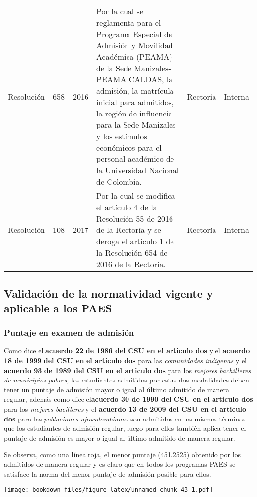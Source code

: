 \documentclass[]{article}
\theoremstyle{definition}
\theoremstyle{definition}
\theoremstyle{definition}
\theoremstyle{remark}
\begin{document}
\begin{table}
\begin{tabular}[t]{lrrlll}
Resolución & 658 & 2016 & Por la cual se reglamenta para el Programa Especial de Admisión y Movilidad Académica (PEAMA) de la Sede Manizales- PEAMA CALDAS, la admisión, la matrícula inicial para admitidos, la región de influencia para la Sede Manizales y los estímulos económicos para el personal académico de la Universidad Nacional de Colombia. & Rectoría & Interna\\
Resolución & 108 & 2017 & Por la cual se modifica el artículo 4 de la Resolución 55 de 2016 de la Rectoría y se deroga el artículo 1 de la Resolución 654 de 2016 de la Rectoría. & Rectoría & Interna\\
\bottomrule
\end{tabular}
\end{table}

\subsection{Validación de la normatividad vigente y aplicable a los
PAES}\label{validacion-de-la-normatividad-vigente-y-aplicable-a-los-paes}

\subsubsection{Puntaje en examen de
admisión}\label{puntaje-en-examen-de-admision-1}

Como dice el \textbf{acuerdo 22 de 1986 del CSU en el articulo dos} y el
\textbf{acuerdo 18 de 1999 del CSU en el articulo dos} para las
\emph{comunidades indigenas} y el \textbf{acuerdo 93 de 1989 del CSU en
el articulo dos} para los \emph{mejores bachilleres de municipios
pobres}, los estudiantes admitidos por estas dos modalidades deben tener
un puntaje de admisión mayor o igual al último admitido de manera
regular, además como dice el\textbf{acuerdo 30 de 1990 del CSU en el
articulo dos} para los \emph{mejores bacilleres} y el \textbf{acuerdo 13
de 2009 del CSU en el articulo dos} para las \emph{poblaciones
afrocolombianas} son admitidos en los mismos términos que los
estudiantes de admisión regular, luego para ellos también aplica tener
el puntaje de admisión es mayor o igual al último admitido de manera
regular.

Se observa, como una línea roja, el menor puntaje (451.2525) obtenido
por los admitidos de manera regular y es claro que en todos los
programas PAES se satisface la norma del menor puntaje de admisión
posible para ellos.

\texttt{[image: bookdown\_files/figure-latex/unnamed-chunk-43-1.pdf]}
\end{document}

